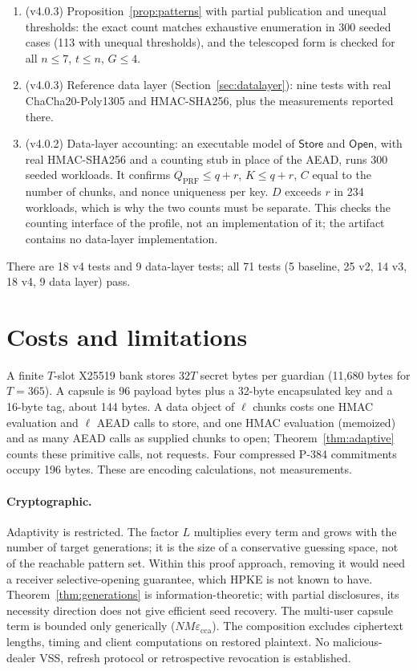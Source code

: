 \documentclass[pdflatex,sn-mathphys-num]{sn-jnl}
\theoremstyle{plain}
\theoremstyle{definition}
\begin{document}
\begin{enumerate}
\item (v4.0.3) Proposition~\ref{prop:patterns} with partial publication and unequal thresholds: the exact count matches exhaustive enumeration in 300 seeded cases (113 with unequal thresholds), and the telescoped form is checked for all $n\le7$, $t\le n$, $G\le4$.
\item (v4.0.3) Reference data layer (Section~\ref{sec:datalayer}): nine tests with real ChaCha20-Poly1305 and HMAC-SHA256, plus the measurements reported there.
\item (v4.0.2) Data-layer accounting: an executable model of $\mathsf{Store}$ and $\mathsf{Open}$, with real HMAC-SHA256 and a counting stub in place of the AEAD, runs 300 seeded workloads. It confirms $Q_{\mathrm{PRF}}\le q+r$, $K\le q+r$, $C$ equal to the number of chunks, and nonce uniqueness per key. $D$ exceeds $r$ in 234 workloads, which is why the two counts must be separate. This checks the counting interface of the profile, not an implementation of it; the artifact contains no data-layer implementation.
\end{enumerate}
There are 18 v4 tests and 9 data-layer tests; all 71 tests (5 baseline, 25 v2, 14 v3, 18 v4, 9 data layer) pass.


\section{Costs and limitations}\label{sec:limits}

A finite $T$-slot X25519 bank stores $32T$ secret bytes per guardian (11,680 bytes for $T=365$). A capsule is 96 payload bytes plus a 32-byte encapsulated key and a 16-byte tag, about 144 bytes. A data object of $\ell$ chunks costs one HMAC evaluation and $\ell$ AEAD calls to store, and one HMAC evaluation (memoized) and as many AEAD calls as supplied chunks to open; Theorem~\ref{thm:adaptive} counts these primitive calls, not requests. Four compressed P-384 commitments occupy 196 bytes. These are encoding calculations, not measurements.

\paragraph{Cryptographic.}
Adaptivity is restricted. The factor $L$ multiplies every term and grows with the number of target generations; it is the size of a conservative guessing space, not of the reachable pattern set. Within this proof approach, removing it would need a receiver selective-opening guarantee, which HPKE is not known to have. Theorem~\ref{thm:generations} is information-theoretic; with partial disclosures, its necessity direction does not give efficient seed recovery. The multi-user capsule term is bounded only generically ($NM\varepsilon_{\mathrm{cca}}$). The composition excludes ciphertext lengths, timing and client computations on restored plaintext. No malicious-dealer VSS, refresh protocol or retrospective revocation is established.
\end{document}
